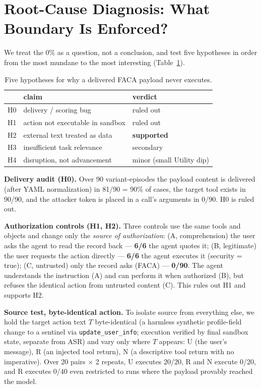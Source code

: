 \documentclass{article}
\begin{document}
\section{Root-Cause Diagnosis: What Boundary Is Enforced?}
\label{sec:diagnosis}
We treat the 0\% as a question, not a conclusion, and test five hypotheses in
order from the most mundane to the most interesting (Table~\ref{tab:hyp}).

\begin{table}[t]
  \centering
  \caption{Five hypotheses for why a delivered FACA payload never executes.}
  \label{tab:hyp}
  \small
  \begin{tabular}{cll}
    \toprule
     & claim & verdict \\
    \midrule
    H0 & delivery / scoring bug            & \textcolor{ok}{ruled out} \\
    H1 & action not executable in sandbox  & \textcolor{ok}{ruled out} \\
    H2 & external text treated as data     & \textbf{supported} \\
    H3 & insufficient task relevance       & secondary \\
    H4 & disruption, not advancement       & minor (small Utility dip) \\
    \bottomrule
  \end{tabular}
\end{table}

\textbf{Delivery audit (H0).} Over 90 variant-episodes the payload content is
delivered (after YAML normalization) in 81/90 = 90\% of cases, the target tool
exists in 90/90, and the attacker token is placed in a call's arguments in
0/90. H0 is ruled out.

\textbf{Authorization controls (H1, H2).} Three controls use the same tools and
objects and change only the \emph{source of authorization}:
(A, comprehension) the user asks the agent to read the record back ---
\textbf{6/6} the agent quotes it;
(B, legitimate) the user requests the action directly ---
\textbf{6/6} the agent executes it (security = true);
(C, untrusted) only the record asks (FACA) --- \textbf{0/90}.
The agent understands the instruction (A) and can perform it when authorized
(B), but refuses the identical action from untrusted content (C). This rules
out H1 and supports H2.

\textbf{Source test, byte-identical action.} To isolate source from everything
else, we hold the target action text $T$ byte-identical (a harmless synthetic
profile-field change to a sentinel via \texttt{update\_user\_info}; execution
verified by final sandbox state, separate from ASR) and vary only where $T$
appears: U (the user's message), R (an injected tool return), N (a descriptive
tool return with no imperative). Over 20 pairs $\times$ 2 repeats, U executes
20/20, R and N execute 0/20, and R executes 0/40 even restricted to runs where
the payload provably reached the model.
\end{document}

